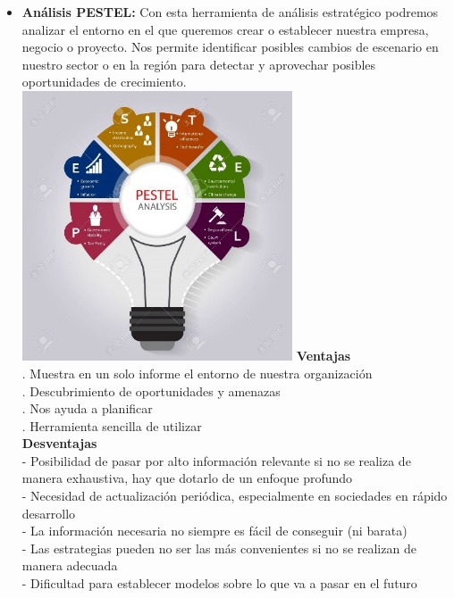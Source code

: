 \documentclass[%
 reprint,
 amsmath,amssymb,
 aps,
]{revtex4-1}
\begin{document}
\begin{itemize}

\item \textbf{ Análisis PESTEL: }
Con esta herramienta de análisis estratégico podremos analizar el entorno en el que queremos crear o establecer nuestra empresa, negocio o proyecto. Nos permite identificar posibles cambios de escenario en nuestro sector o en la región para detectar y aprovechar posibles oportunidades de crecimiento.
\includegraphics[width=8cm]{./Imagenes/img1}
\textbf{ Ventajas}\\
. Muestra en un solo informe el entorno de nuestra organización\\
. Descubrimiento de oportunidades y amenazas\\
. Nos ayuda a planificar\\
. Herramienta sencilla de utilizar\\
\textbf{ Desventajas}\\
- Posibilidad de pasar por alto información relevante si no se realiza de manera exhaustiva, hay que dotarlo de un enfoque profundo\\
- Necesidad de actualización periódica, especialmente en sociedades en rápido desarrollo\\
- La información necesaria no siempre es fácil de conseguir (ni barata)\\
- Las estrategias pueden no ser las más convenientes si no se realizan de manera adecuada\\
- Dificultad para establecer modelos sobre lo que va a pasar en el futuro


\end{itemize}
\end{document}
